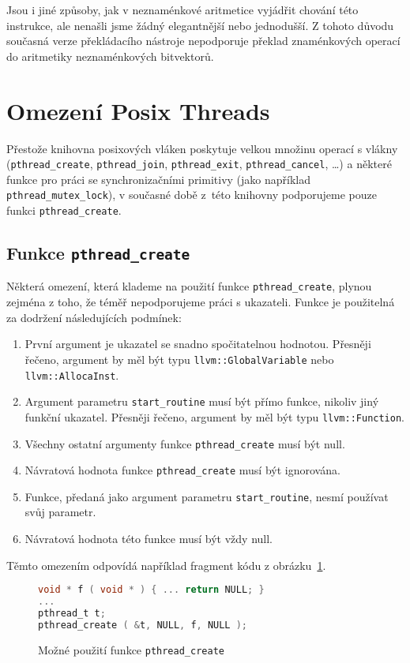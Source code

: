 \documentclass[12pt]{fithesis2}
\begin{document}
Jsou i jiné způsoby, jak v neznaménkové aritmetice vyjádřit chování této instrukce, ale nenašli jsme žádný elegantnější nebo jednodušší. Z tohoto důvodu současná verze překládacího nástroje nepodporuje překlad znaménkových operací do aritmetiky neznaménkových bitvektorů.

\section{Omezení Posix Threads}
Přestože knihovna posixových vláken poskytuje velkou množinu operací s vlákny (\texttt{pthread\_create}, \texttt{pthread\_join}, \texttt{pthread\_exit}, \linebreak\texttt{pthread\_cancel}, \ldots) a některé funkce pro práci se synchronizačními primitivy (jako například \texttt{pthread\_mutex\_lock}), v současné době z~této knihovny podporujeme pouze funkci \texttt{pthread\_create}.

\subsection{Funkce \texttt{pthread\_create}}
Některá omezení, která klademe na použití funkce \texttt{pthread\_create}, plynou zejména z toho, že téměř nepodporujeme práci s ukazateli. Funkce je použitelná za dodržení následujících podmínek:

\begin{enumerate}
\item První argument je ukazatel se snadno spočitatelnou hodnotou. Přesněji řečeno, argument by měl být typu \texttt{llvm::GlobalVariable} nebo \texttt{llvm::AllocaInst}.
\item Argument parametru \texttt{start\_routine} musí být přímo funkce, nikoliv jiný funkční ukazatel. Přesněji řečeno, argument by měl být typu \texttt{llvm::Function}.
\item Všechny ostatní argumenty funkce \texttt{pthread\_create} musí být null.
\item Návratová hodnota funkce \texttt{pthread\_create} musí být ignorována.
\item Funkce, předaná jako argument parametru \texttt{start\_routine}, nesmí používat svůj parametr.
\item Návratová hodnota této funkce musí být vždy null.
\end{enumerate}

Těmto omezením odpovídá například fragment kódu z obrázku~\ref{fig:pthread-create-usage-c}.
\begin{figure}[h!]
\begin{lstlisting}[language=C]
void * f ( void * ) { ... return NULL; }
...
pthread_t t;
pthread_create ( &t, NULL, f, NULL );
\end{lstlisting}
\caption{Možné použití funkce \texttt{pthread\_create}}
\label{fig:pthread-create-usage-c}
\end{figure}
\end{document}
